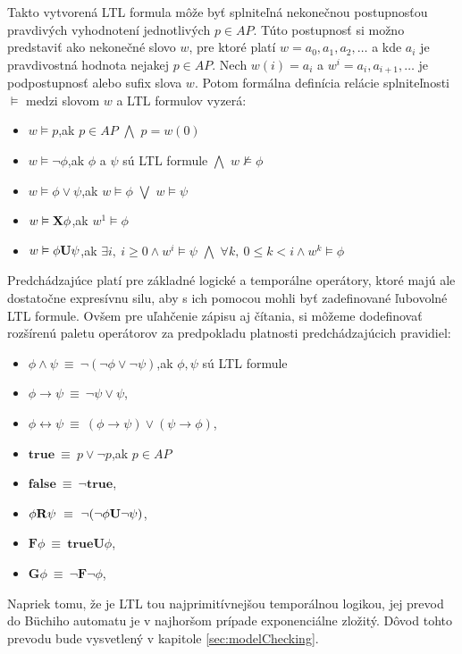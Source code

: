 \documentclass[11pt,final,oneside]{fithesis}
\begin{document}
Takto vytvoren\'a LTL formula m\^ o\v ze by\v t splnite\v ln\'a nekone\v cnou postupnos\v tou pravdiv\'ych vyhodnoten\'i jednotliv\'ych $p \in AP$. 
T\'uto postupnos\v t si mo\v zno predstavi\v t ako nekone\v cn\'e slovo $w$, pre ktor\'e plat\'i $w = a_0,a_1,a_2,\dots{}$ a kde $a_i$ je pravdivostn\'a hodnota
nejakej $p \in AP$. Nech $w(i) = a_i$ a $w^i = a_i,a_{i+1},\dots{}$ je podpostupnos\v t alebo sufix slova $w$. Potom form\'alna defin\'icia rel\'acie splnite\v lnosti
$\vDash$ medzi slovom $w$ a LTL formulov vyzer\'a:
\begin{itemize}
\item $w \vDash p$,\hfil ak $p \in AP$ $\bigwedge$ $p = w(0)$
\item $w \vDash \neg\phi$,\hfil ak $\phi$ a $\psi$ s\'u LTL formule $\bigwedge$ $w \nvDash \phi$
\item $w \vDash \phi \vee \psi$,\hfil ak $w \vDash \phi$ $\bigvee$ $w \vDash \psi$
\item $w \vDash {\bf X}\phi$,\hfil ak $w^1 \vDash \phi$
\item $w \vDash \phi {\bf U} \psi$,\hfil ak $\exists i,\ i \geq 0 \wedge w^i \vDash \psi$ $\bigwedge$ $\forall k,\ 0 \leq k < i \wedge w^k \vDash \phi$
\end{itemize}
Predch\'adzaj\'uce plat\'i pre z\'akladn\'e logick\'e a tempor\'alne oper\'atory, ktor\'e maj\'u ale dostato\v cne expres\'ivnu silu, aby s ich pomocou
mohli by\v t zadefinovan\'e \v lubovoln\'e LTL formule. Ov\v sem pre u\v lah\v cenie z\'apisu aj \v c\'itania, si m\^ o\v zeme dodefinova\v t roz\v s\'iren\'u
paletu oper\'atorov za predpokladu platnosti predch\'adzaj\'ucich pravidiel:
\begin{itemize}
\item $\phi \wedge \psi \ \equiv \ \neg(\neg \phi \vee \neg \psi)$,\hfil ak $\phi, \psi$ s\'u LTL formule
\item $\phi \rightarrow \psi \ \equiv \ \neg \psi \vee \psi$,
\item $\phi \leftrightarrow \psi \ \equiv \ (\phi \rightarrow \psi) \vee (\psi \rightarrow \phi)$,
\item $\mathbf{true} \ \equiv \ p \vee \neg p$,\hfil ak $p \in AP$
\item $\mathbf{false} \ \equiv \ \neg\mathbf{true}$,
\item $\phi {\bf R} \psi \ \equiv \ \neg(\neg\phi{\bf U}\neg\psi)$,
\item $\mathbf{F} \phi \ \equiv \ \mathbf{true U} \phi$,
\item $\mathbf{G} \phi \ \equiv \ \neg \mathbf{F} \neg \phi$,
\end{itemize}
Napriek tomu, \v ze je LTL tou najprimit\' ivnej\v sou tempor\'alnou logikou, jej prevod do B\"uchiho automatu je v najhor\v som pr\' ipade 
exponenci\' alne zlo\v zit\' y. D\^ ovod tohto prevodu bude vysvetlen\' y v kapitole \ref{sec:modelChecking}. 
\cite{Clarke:MC:LTL}
\end{document}
